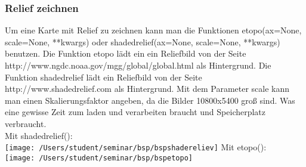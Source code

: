  \subsubsection*{Relief zeichnen}
 Um eine Karte mit Relief zu zeichnen kann man die Funktionen \textsf{etopo(ax=None, scale=None, **kwargs)} oder \textsf{shadedrelief(ax=None, scale=None, **kwargs)} benutzen. Die Funktion \textsf{etopo} lädt ein ein Reliefbild von der Seite \textsf{http://www.ngdc.noaa.gov/mgg/global/global.html} als Hintergrund. Die Funktion \textsf{shadedrelief} lädt ein Reliefbild von der Seite \textsf{http://www.shadedrelief.com} als Hintergrund. Mit dem Parameter \textsf{scale} kann man einen Skalierungsfaktor angeben, da die Bilder 10800x5400 groß sind. Was eine gewisse Zeit zum laden und verarbeiten braucht und Speicherplatz verbraucht.\\
 Mit \textsf{shadedrelief()}:\\
 
 \texttt{[image: /Users/student/seminar/bsp/bspshadereliev]}
 Mit \textsf{etopo()}:\\
 
 \texttt{[image: /Users/student/seminar/bsp/bspetopo]}